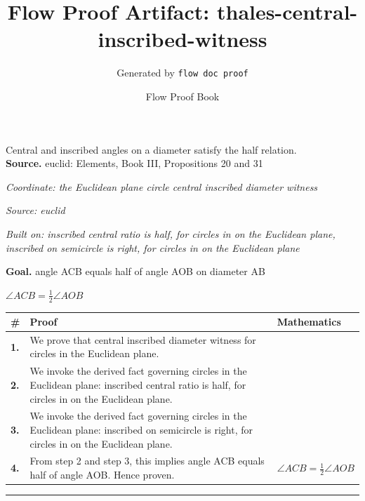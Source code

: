 \documentclass[11pt]{article}
\title{Flow Proof Artifact: thales-central-inscribed-witness}
\author{Generated by \texttt{flow doc proof}}
\date{Flow Proof Book}
\theoremstyle{definition}
\begin{document}
\maketitle
Central and inscribed angles on a diameter satisfy the half relation.\\[0.5em]
\textbf{Source.} euclid: Elements, Book III, Propositions 20 and 31\\[0.5em]
\bigskip
{}\par
\smallskip\noindent\textit{Coordinate: the Euclidean plane \cdot circle \cdot central inscribed diameter witness}\par
\smallskip\noindent\textit{Source: euclid}\par
\smallskip\noindent\textit{Built on: inscribed central ratio is half, for circles in on the Euclidean plane, inscribed on semicircle is right, for circles in on the Euclidean plane}\par
\medskip
\noindent\textbf{Goal.} angle ACB equals half of angle AOB on diameter AB\par
\noindent$\displaystyle \angle ACB = \tfrac{1}{2}\angle AOB$\par
\medskip
\noindent
\begin{tabular}{@{} >{\raggedright\arraybackslash}p{} >{\raggedright\arraybackslash}p{} >{\raggedleft\arraybackslash}p{} @{}}
\textbf{\#} & \textbf{Proof} & \textbf{Mathematics} \\
\midrule
\textbf{1.} & We prove that central inscribed diameter witness for circles in the Euclidean plane. & \\[0.45em]
\textbf{2.} & We invoke the derived fact governing circles in the Euclidean plane: inscribed central ratio is half, for circles in on the Euclidean plane. & \\[0.45em]
\textbf{3.} & We invoke the derived fact governing circles in the Euclidean plane: inscribed on semicircle is right, for circles in on the Euclidean plane. & \\[0.45em]
\textbf{4.} & From step 2 and step 3, this implies angle ACB equals half of angle AOB. Hence proven. & $\displaystyle \angle ACB = \tfrac{1}{2}\angle AOB$ \\[0.45em]
\bottomrule
\end{tabular}
\label{thm:Geometry-circle-central_inscribed_diameter_witness}
\par\medskip\hrule
\end{document}
